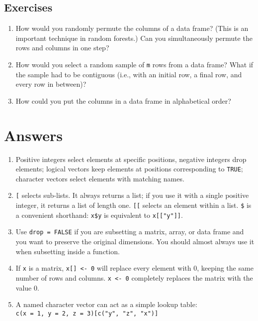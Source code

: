 \hypertarget{exercises-2}{%
\subsection{Exercises}\label{exercises-2}}

\begin{enumerate}
\def\labelenumi{\arabic{enumi}.}
\item
  How would you randomly permute the columns of a data frame? (This is
  an important technique in random forests.) Can you simultaneously
  permute the rows and columns in one step?
\item
  How would you select a random sample of \texttt{m} rows from a data
  frame? What if the sample had to be contiguous (i.e., with an initial
  row, a final row, and every row in between)?
\item
  How could you put the columns in a data frame in alphabetical order?
\end{enumerate}

\hypertarget{subsetting-answers}{%
\section{Answers}\label{subsetting-answers}}

\begin{enumerate}
\def\labelenumi{\arabic{enumi}.}
\item
  Positive integers select elements at specific positions, negative
  integers drop elements; logical vectors keep elements at positions
  corresponding to \texttt{TRUE}; character vectors select elements with
  matching names.
\item
  \texttt{{[}} selects sub-lists. It always returns a list; if you use
  it with a single positive integer, it returns a list of length one.
  \texttt{{[}{[}} selects an element within a list. \texttt{\$} is a
  convenient shorthand: \texttt{x\$y} is equivalent to
  \texttt{x{[}{[}"y"{]}{]}}.
\item
  Use \texttt{drop\ =\ FALSE} if you are subsetting a matrix, array, or
  data frame and you want to preserve the original dimensions. You
  should almost always use it when subsetting inside a function.
\item
  If \texttt{x} is a matrix, \texttt{x{[}{]}\ \textless{}-\ 0} will
  replace every element with 0, keeping the same number of rows and
  columns. \texttt{x\ \textless{}-\ 0} completely replaces the matrix
  with the value 0.
\item
  A named character vector can act as a simple lookup table:
  \texttt{c(x\ =\ 1,\ y\ =\ 2,\ z\ =\ 3){[}c("y",\ "z",\ "x"){]}}
\end{enumerate}
